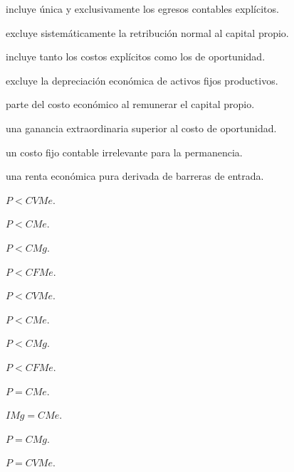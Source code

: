 \begin{opts}
    \item incluye única y exclusivamente los egresos contables explícitos.
    \item excluye sistemáticamente la retribución normal al capital propio.
    \item incluye tanto los costos explícitos como los de oportunidad.
    \item excluye la depreciación económica de activos fijos productivos.
\end{opts}

\begin{opts}
    \item parte del costo económico al remunerar el capital propio.
    \item una ganancia extraordinaria superior al costo de oportunidad.
    \item un costo fijo contable irrelevante para la permanencia.
    \item una renta económica pura derivada de barreras de entrada.
\end{opts}

\begin{opts}
    \item $P<CVMe$.
    \item $P<CMe$.
    \item $P<CMg$.
    \item $P<CFMe$.
\end{opts}

\begin{opts}
    \item $P<CVMe$.
    \item $P<CMe$.
    \item $P<CMg$.
    \item $P<CFMe$.
\end{opts}

\begin{opts}
    \item $P=CMe$.
    \item $IMg=CMe$.
    \item $P=CMg$.
    \item $P=CVMe$.
\end{opts}

